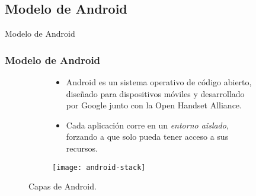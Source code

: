 \subsection{Modelo de Android}
\begin{frame}
 \begin{center}
  \LARGE Modelo de Android
 \end{center}
\end{frame}
\begin{frame}
 \frametitle{Modelo de Android}
 \begin{figure}[tH]
  \begin{subfigure}{0.58\linewidth}
  \begin{small}
   \begin{itemize}
    \item Android es un sistema operativo de código abierto, diseñado para dispositivos móviles y desarrollado por Google junto con la Open Handset Alliance.
    \item <3->{Cada aplicación corre en un \emph{entorno aislado}, forzando a que solo pueda tener acceso a sus recursos.}
   \end{itemize}
     \end{small}
  \end{subfigure}
  \begin{subfigure}{0.4\linewidth}\pause
    \centering
   		\texttt{[image: android-stack]}
  \end{subfigure}
  \caption{Capas de Android.}
\end{figure}
\end{frame}
